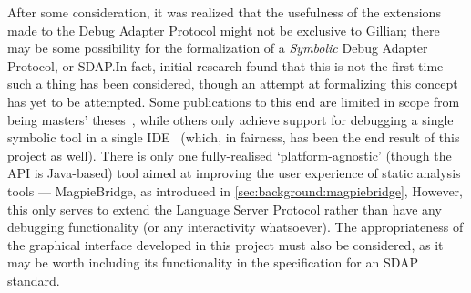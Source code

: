 After some consideration, it was realized that the usefulness of the extensions
made to the Debug Adapter Protocol might not be exclusive to Gillian; there may
be some possibility for the formalization of a \textit{Symbolic} Debug Adapter
Protocol, or SDAP.\@ In fact, initial research found that this is not the first
time such a thing has been considered, though an attempt at formalizing this
concept has yet to be attempted. Some publications to this end are limited in
scope from being masters' theses~\cite{sdap-arxiv, sdap-aurecchia},  while others
only achieve support for debugging a single symbolic tool in a single
IDE~\cite{sdap-colombo, sdap-kps}  (which, in fairness, has been the end result
of this project as well).
There is only one fully-realised `platform-agnostic' (though the API is
Java-based) tool aimed at improving the user experience of static analysis tools
--- MagpieBridge, as introduced in \autoref{sec:background:magpiebridge},
However, this only serves to extend the Language Server Protocol rather than
have any debugging functionality (or any interactivity whatsoever).
The appropriateness of the graphical interface developed in this project must
also be considered, as it may be worth including its functionality in the
specification for an SDAP standard.
